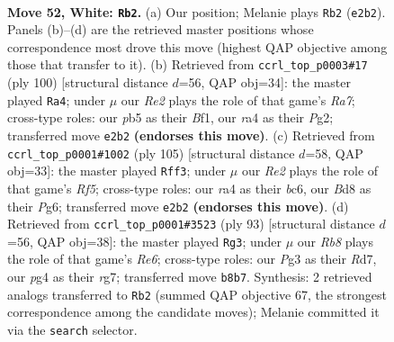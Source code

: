 \documentclass[11pt]{article}
\begin{document}
\clearpage

\begin{figure}[p]\centering
\begin{subfigure}{0.46\textwidth}\centering
\resizebox{\linewidth}{!}{%
\newchessgame
\chessboard[
  setfen={1R1B4/5k2/2r1b3/1p6/rn4p1/4P1PP/4RP1K/8 w - - 4 52},
  showmover=false,
  pgfstyle=straightmove, color=movearrow, markmove={e2-b2}
]}
\caption{}
\end{subfigure}\hfill
\begin{subfigure}{0.46\textwidth}\centering
\resizebox{\linewidth}{!}{%
\newchessgame
\chessboard[
  setfen={8/R5pk/4r1b1/2pR4/7p/1P3P1P/6P1/2r2BK1 w - - 1 51},
  showmover=false,
  pgfstyle=straightmove, color=movearrow, markmove={a7-a4}
]}
\caption{}
\end{subfigure}
\\[4pt]
\begin{subfigure}{0.46\textwidth}\centering
\resizebox{\linewidth}{!}{%
\newchessgame
\chessboard[
  setfen={8/P3k3/2Bp2p1/1NpP2P1/4br2/1r6/4K3/4R3 b - - 2 53},
  showmover=false,
  pgfstyle=straightmove, color=movearrow, markmove={f4-f3}
]}
\caption{}
\end{subfigure}\hfill
\begin{subfigure}{0.46\textwidth}\centering
\resizebox{\linewidth}{!}{%
\newchessgame
\chessboard[
  setfen={8/3r1pR1/1k2p3/2p5/2P3P1/1P2r2b/1KB2R2/8 b - - 3 47},
  showmover=false,
  pgfstyle=straightmove, color=movearrow, markmove={e3-g3}
]}
\caption{}
\end{subfigure}
\caption{\textbf{Move 52, White: \texttt{Rb2}.} (a) Our position; Melanie plays \texttt{Rb2} (\texttt{e2b2}). Panels (b)--(d) are the retrieved master positions whose correspondence most drove this move (highest QAP objective among those that transfer to it). (b) Retrieved from \texttt{ccrl\_top\_p0003\#17} (ply 100) [structural distance $d$=56, QAP obj=34]: the master played \texttt{Ra4}; under $\mu$ our \emph{Re2} plays the role of that game's \emph{Ra7}; cross-type roles: our \emph{p}b5 as their \emph{B}f1, our \emph{r}a4 as their \emph{P}g2; transferred move \texttt{e2b2} \textbf{(endorses this move)}. (c) Retrieved from \texttt{ccrl\_top\_p0001\#1002} (ply 105) [structural distance $d$=58, QAP obj=33]: the master played \texttt{Rff3}; under $\mu$ our \emph{Re2} plays the role of that game's \emph{Rf5}; cross-type roles: our \emph{r}a4 as their \emph{b}c6, our \emph{B}d8 as their \emph{P}g6; transferred move \texttt{e2b2} \textbf{(endorses this move)}. (d) Retrieved from \texttt{ccrl\_top\_p0001\#3523} (ply 93) [structural distance $d$=56, QAP obj=38]: the master played \texttt{Rg3}; under $\mu$ our \emph{Rb8} plays the role of that game's \emph{Re6}; cross-type roles: our \emph{P}g3 as their \emph{R}d7, our \emph{p}g4 as their \emph{r}g7; transferred move \texttt{b8b7}. Synthesis: 2 retrieved analogs transferred to \texttt{Rb2} (summed QAP objective 67, the strongest correspondence among the candidate moves); Melanie committed it via the \texttt{search} selector.}
\label{fig:thought-m102}
\end{figure}
\end{document}
